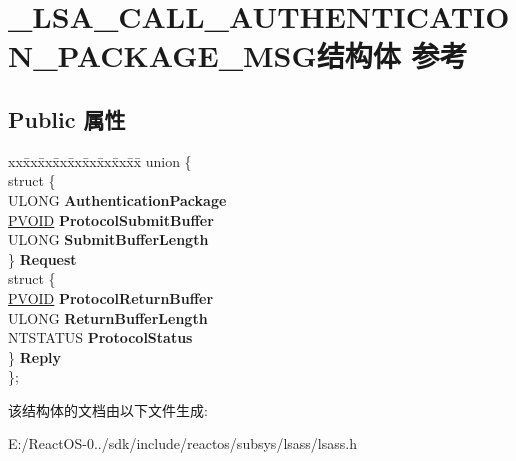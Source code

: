 \hypertarget{struct___l_s_a___c_a_l_l___a_u_t_h_e_n_t_i_c_a_t_i_o_n___p_a_c_k_a_g_e___m_s_g}{}\section{\+\_\+\+L\+S\+A\+\_\+\+C\+A\+L\+L\+\_\+\+A\+U\+T\+H\+E\+N\+T\+I\+C\+A\+T\+I\+O\+N\+\_\+\+P\+A\+C\+K\+A\+G\+E\+\_\+\+M\+S\+G结构体 参考}
\label{struct___l_s_a___c_a_l_l___a_u_t_h_e_n_t_i_c_a_t_i_o_n___p_a_c_k_a_g_e___m_s_g}
\subsection*{Public 属性}
\begin{DoxyCompactItemize}
\item 
\mbox{\label{struct___l_s_a___c_a_l_l___a_u_t_h_e_n_t_i_c_a_t_i_o_n___p_a_c_k_a_g_e___m_s_g_a0b34c5e631e7f2686734e6051b0b1f9a}} 
\begin{tabbing}
xx\=xx\=xx\=xx\=xx\=xx\=xx\=xx\=xx\=\kill
union \{\\
\>struct \{\\
\>\>ULONG {\bfseries AuthenticationPackage}\\
\>\>\hyperlink{interfacevoid}{PVOID} {\bfseries ProtocolSubmitBuffer}\\
\>\>ULONG {\bfseries SubmitBufferLength}\\
\>\} {\bfseries Request}\\
\>struct \{\\
\>\>\hyperlink{interfacevoid}{PVOID} {\bfseries ProtocolReturnBuffer}\\
\>\>ULONG {\bfseries ReturnBufferLength}\\
\>\>NTSTATUS {\bfseries ProtocolStatus}\\
\>\} {\bfseries Reply}\\
\}; \\

\end{tabbing}\end{DoxyCompactItemize}


该结构体的文档由以下文件生成\+:\begin{DoxyCompactItemize}
\item 
E\+:/\+React\+O\+S-\/0../sdk/include/reactos/subsys/lsass/lsass.\+h\end{DoxyCompactItemize}
